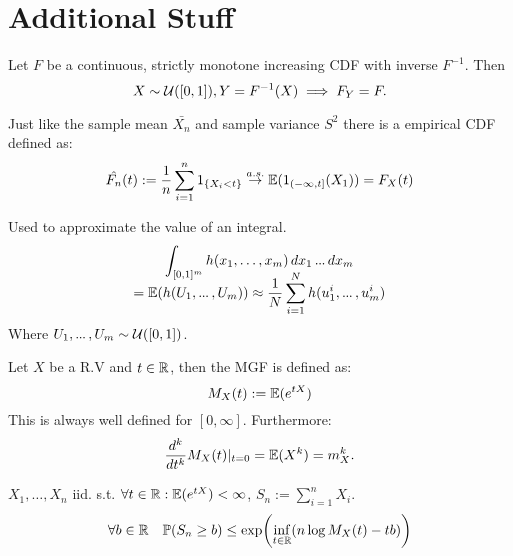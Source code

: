 \section{Additional Stuff}
\begin{theorem*}
  Let \(F\) be a continuous, strictly monotone increasing CDF with inverse \(F^{-1}\). Then
  \[X \sim \operatorname{\mathcal{U}}([0, 1]), Y = F^{-1}(X) \implies F_Y = F.\]

\end{theorem*}

\begin{definition*}
  Just like the sample mean \(\bar{X_n}\) and sample variance \(S^2\) there is a empirical CDF defined as:
  \[\hat{F_n}(t) := \frac{1}{n}\sum_{i=1}^n 1_{\{X_i < t\}} \stackrel{a.s.}{\to} \mathbb{E}(1_{(-\infty, t]}(X_1)) = F_X(t)\]
\end{definition*}

\begin{definition*}
  Used to approximate the value of an integral.
  \begin{multline*}
    \int_{[0, 1]^m} h(x_1, \ldots, x_m) \, dx_1 \sdots dx_m \\[-10pt]
    = \E(h(U_1, \sdots, U_m)) \approx \frac{1}{N} \sum_{i=1}^N h(u_1^i, \sdots, u_m^i)
  \end{multline*}
  Where \(U_1, \sdots, U_m \sim \Unif([0, 1])\).
\end{definition*}

\begin{definition*}
  Let \(X\) be a R.V and \(t \in \mathbb{R}\), then the MGF is defined as:
  \[M_X(t) := \mathbb{E}(e^{tX})\]
  This is always well defined for \([0, \infty]\). Furthermore:
  \[\frac{d^k}{dt^k} M_X(t) |_{t=0} = \mathbb{E}(X^k) = m_X^k.\]
\end{definition*}



\begin{theorem*}
  \(X_1, \ldots, X_n\) iid. s.t. \(\forall t \in \mathbb{R}: \mathbb{E}(e^{tX}) < \infty \), \(S_n := \sum\limits_{i=1}^n X_i\).
  \[\forall b \in \mathbb{R} \quad \mathbb{P}(S_n \geq b) \leq \exp(\underset{t \in \mathbb{R}}{\inf}(n \log M_X(t) - tb))\]
\end{theorem*}